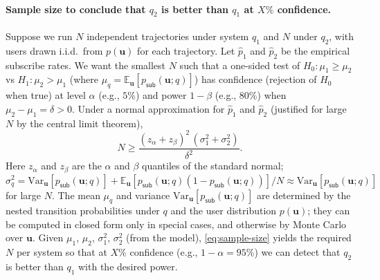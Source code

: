 \paragraph{Sample size to conclude that $q_2$ is better than $q_1$ at $X\%$ confidence.}
Suppose we run $N$ independent trajectories under system $q_1$ and $N$ under $q_2$, with users drawn i.i.d.\ from $p(\mathbf{u})$ for each trajectory. Let $\widehat{p}_1$ and $\widehat{p}_2$ be the empirical subscribe rates. We want the smallest $N$ such that a one-sided test of $H_0: \mu_1 \geq \mu_2$ vs $H_1: \mu_2 > \mu_1$ (where $\mu_q = \mathbb{E}_{\mathbf{u}}[p_{\mathsf{sub}}(\mathbf{u}; q)]$) has confidence (rejection of $H_0$ when true) at level $\alpha$ (e.g., $5\%$) and power $1 - \beta$ (e.g., $80\%$) when $\mu_2 - \mu_1 = \delta > 0$. Under a normal approximation for $\widehat{p}_1$ and $\widehat{p}_2$ (justified for large $N$ by the central limit theorem),
\begin{equation}
  N \geq \frac{(z_{\alpha} + z_{\beta})^2\, (\sigma_1^2 + \sigma_2^2)}{\delta^2}. \label{eq:sample-size}
\end{equation}
Here $z_{\alpha}$ and $z_{\beta}$ are the $\alpha$ and $\beta$ quantiles of the standard normal; $\sigma_q^2 = \mathrm{Var}_{\mathbf{u}}[p_{\mathsf{sub}}(\mathbf{u}; q)] + \mathbb{E}_{\mathbf{u}}[p_{\mathsf{sub}}(\mathbf{u}; q)(1 - p_{\mathsf{sub}}(\mathbf{u}; q))]/N \approx \mathrm{Var}_{\mathbf{u}}[p_{\mathsf{sub}}(\mathbf{u}; q)]$ for large $N$. The mean $\mu_q$ and variance $\mathrm{Var}_{\mathbf{u}}[p_{\mathsf{sub}}(\mathbf{u}; q)]$ are determined by the nested transition probabilities under $q$ and the user distribution $p(\mathbf{u})$; they can be computed in closed form only in special cases, and otherwise by Monte Carlo over $\mathbf{u}$. Given $\mu_1$, $\mu_2$, $\sigma_1^2$, $\sigma_2^2$ (from the model), \eqref{eq:sample-size} yields the required $N$ per system so that at $X\%$ confidence (e.g., $1-\alpha = 95\%$) we can detect that $q_2$ is better than $q_1$ with the desired power.

